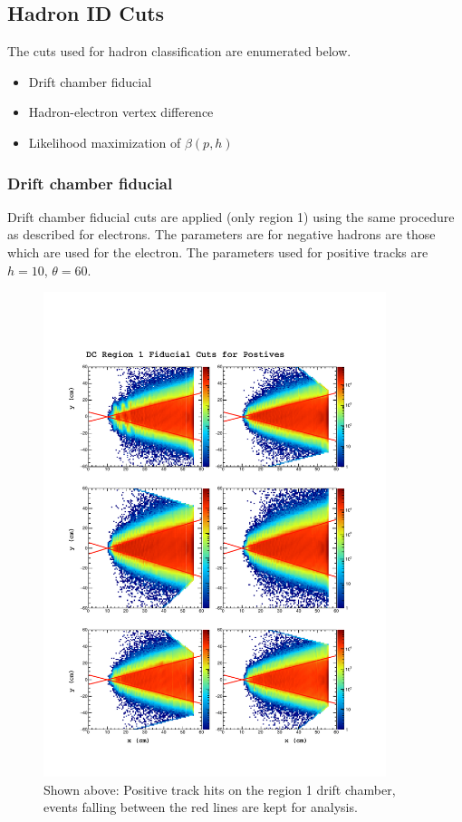 \subsection{Hadron ID Cuts}

The cuts used for hadron classification are enumerated below.

\begin{itemize}
  \item{Drift chamber fiducial}
  \item{Hadron-electron vertex difference}
  \item{Likelihood maximization of $\beta(p,h)$}
\end{itemize}


\subsubsection*{Drift chamber fiducial}
Drift chamber fiducial cuts are applied (only region 1) using the same procedure as described for electrons.  The parameters are for negative hadrons are those which are used for the electron.  The parameters used for positive tracks are $h = 10$, $\theta = 60$.

\begin{figure}
  \label{fig:fid}
  \begin{center}
    \includegraphics[width=10cm]{image/plots/hadron-id/fid.pdf}
    \caption{Shown above: Positive track hits on the region 1 drift chamber, events falling between the red lines are kept for analysis.}
  \end{center}
\end{figure}

